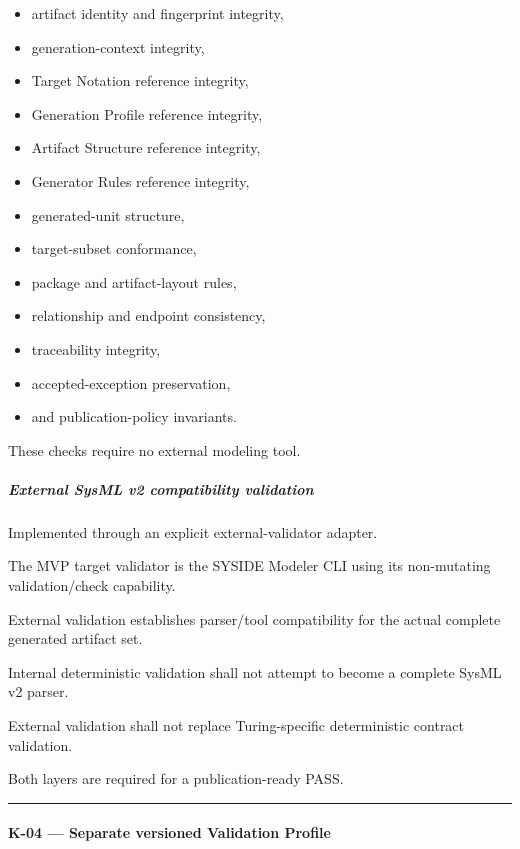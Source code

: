 \begin{itemize}
\tightlist
\item
  artifact identity and fingerprint integrity,
\item
  generation-context integrity,
\item
  Target Notation reference integrity,
\item
  Generation Profile reference integrity,
\item
  Artifact Structure reference integrity,
\item
  Generator Rules reference integrity,
\item
  generated-unit structure,
\item
  target-subset conformance,
\item
  package and artifact-layout rules,
\item
  relationship and endpoint consistency,
\item
  traceability integrity,
\item
  accepted-exception preservation,
\item
  and publication-policy invariants.
\end{itemize}

These checks require no external modeling tool.

\hypertarget{external-sysml-v2-compatibility-validation}{%
\subparagraph{External SysML v2 compatibility validation}\label{external-sysml-v2-compatibility-validation}}

Implemented through an explicit external-validator adapter.

The MVP target validator is the SYSIDE Modeler CLI using its non-mutating validation/check capability.

External validation establishes parser/tool compatibility for the actual complete generated artifact set.

Internal deterministic validation shall not attempt to become a complete SysML v2 parser.

External validation shall not replace Turing-specific deterministic contract validation.

Both layers are required for a publication-ready PASS.

\begin{center}\rule{0.5\linewidth}{0.5pt}\end{center}

\hypertarget{k-04--separate-versioned-validation-profile}{%
\paragraph{K-04 --- Separate versioned Validation Profile}\label{k-04--separate-versioned-validation-profile}}

